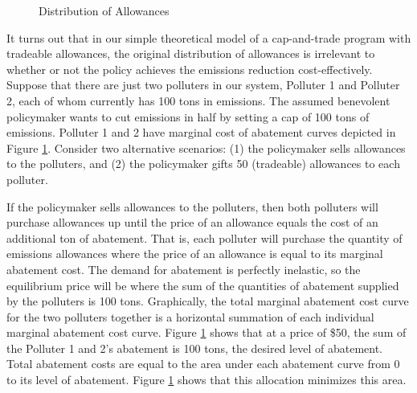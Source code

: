\begin{figure}
\caption{Distribution of Allowances \label{dist_allowance}}
\centering
{}
\end{figure}

It turns out that in our simple theoretical model of a cap-and-trade program with tradeable allowances, the original distribution of allowances is irrelevant to whether or not the policy achieves the emissions reduction cost-effectively. Suppose that there are just two polluters in our system, Polluter 1 and Polluter 2, each of whom currently has 100 tons in emissions. The assumed benevolent policymaker wants to cut emissions in half by setting a cap of 100 tons of emissions. Polluter 1 and 2 have marginal cost of abatement curves depicted in Figure \ref{dist_allowance}. Consider two alternative scenarios: (1) the policymaker sells allowances to the polluters, and (2) the policymaker gifts 50 (tradeable) allowances to each polluter. 

If the policymaker sells allowances to the polluters, then both polluters will purchase allowances up until the price of an allowance equals the cost of an additional ton of abatement. That is, each polluter will purchase the quantity of emissions allowances where the price of an allowance is equal to its marginal abatement cost. The demand for abatement is perfectly inelastic, so the equilibrium price will be where the sum of the quantities of abatement supplied by the polluters is 100 tons. Graphically, the total marginal abatement cost curve for the two polluters together is a horizontal summation of each individual marginal abatement cost curve. Figure \ref{dist_allowance} shows that at a price of \$50, the sum of the Polluter 1 and 2's abatement is 100 tons, the desired level of abatement. Total abatement costs are equal to the area under each abatement curve from 0 to its level of abatement. Figure \ref{dist_allowance} shows that this allocation minimizes this area. 


